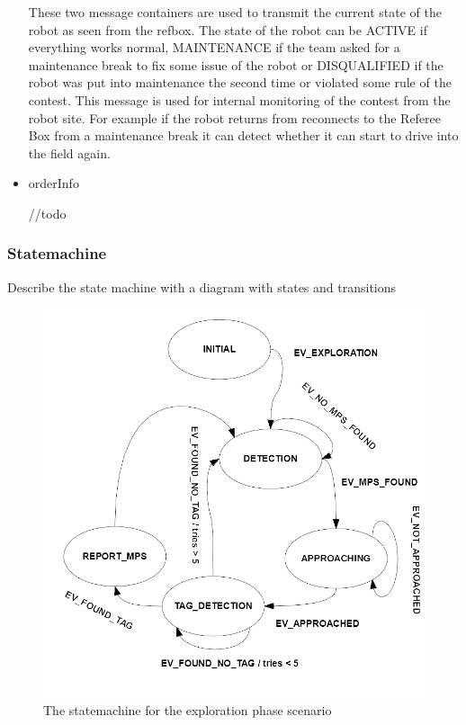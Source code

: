 \begin{itemize}
These two message containers are used to transmit the current state of the robot as seen from the refbox. The state of the robot can be ACTIVE if everything works normal, MAINTENANCE if the team asked for a maintenance break to fix some issue of the robot or DISQUALIFIED if the robot was put into maintenance the second time or violated some rule of the contest. This message is used for internal monitoring of the contest from the robot site. For example if the robot returns from reconnects to the Referee Box from a maintenance break it can detect whether it can start to drive into the field again.  


\item orderInfo

//todo 


\end{itemize}


\subsubsection{Statemachine}

Describe the state machine with a diagram with states
and transitions

\begin{figure}[h]
\centering
\includegraphics[scale=0.5]{pic/robotino_state_machine.png}
\caption{The statemachine for the exploration phase scenario}
\label{fig:statemachine}
\end{figure}

